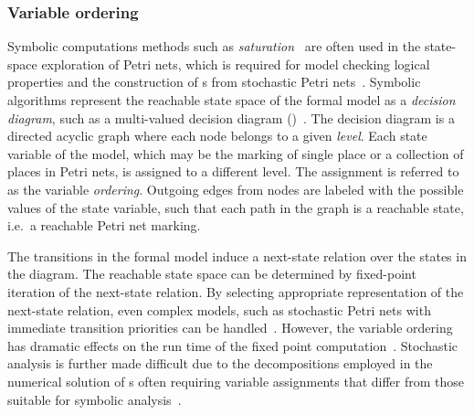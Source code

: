 \subsubsection{Variable ordering}

Symbolic computations methods such as \emph{saturation}~\citep{Ciardo01saturation,Ciardo12tenyears} are often used in the state-space exploration of Petri nets, which is required for model checking logical properties and the construction of s from stochastic Petri nets~\citep{Miner04mdd}. Symbolic algorithms represent the reachable state space of the formal model as a \emph{decision diagram}, such as a multi-valued decision diagram ()~\citep{Kam98mdd}. The decision diagram is a directed acyclic graph where each node belongs to a given \emph{level}. Each state variable of the model, which may be the marking of single place or a collection of places in Petri nets, is assigned to a different level. The assignment is referred to as the variable \emph{ordering}. Outgoing edges from nodes are labeled with the possible values of the state variable, such that each path in the graph is a reachable state, i.e.~a reachable Petri net marking.

The transitions in the formal model induce a next-state relation over the states in the diagram. The reachable state space can be determined by fixed-point iteration of the next-state relation. By selecting appropriate representation of the next-state relation, even complex models, such as stochastic Petri nets with immediate transition priorities can be handled~\citep{Miner06saturation,Marussy17priorities}. However, the variable ordering has dramatic effects on the run time of the fixed point computation~\citep{Amparore17ordering}. Stochastic analysis is further made difficult due to the decompositions employed in the numerical solution of s often requiring variable assignments that differ from those suitable for symbolic analysis~\citep{Marussy16decompositions}.

